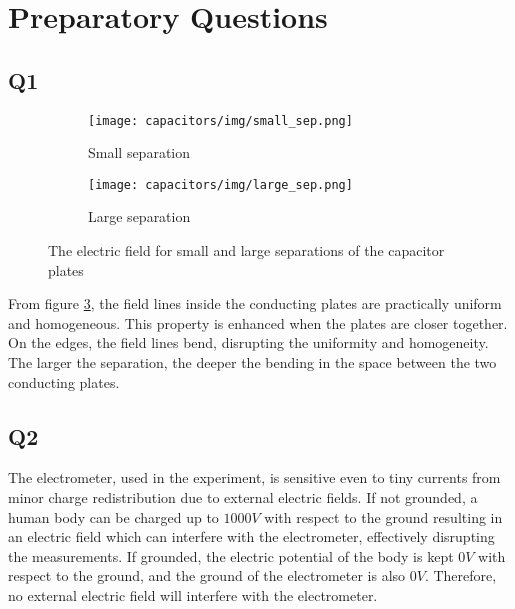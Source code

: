 \section{Preparatory Questions}

\subsection{Q1} \label{appendix:preps:q1}

\begin{figure}[H]
  \begin{subfigure}{0.5\textwidth}
    \texttt{[image: capacitors/img/small\_sep.png]}
    \caption{Small separation} \label{prep_answers:fig:q1:small_sep}
  \end{subfigure}
  \hspace*{\fill}
  \begin{subfigure}{0.5\textwidth}
    \texttt{[image: capacitors/img/large\_sep.png]}
    \caption{Large separation} \label{prep_answers:fig:q1:large_sep}
  \end{subfigure}
  
  \caption{The electric field for small and large separations of the capacitor plates}
  \label{prep_answers:fig:q1}
\end{figure}

From figure \ref{prep_answers:fig:q1}, the field lines inside the conducting plates are practically uniform and homogeneous. This property is enhanced when the plates are closer together. On the edges, the field lines bend, disrupting the uniformity and homogeneity. The larger the separation, the deeper the bending in the space between the two conducting plates.

\subsection{Q2}

The electrometer, used in the experiment, is sensitive even to tiny currents from minor charge redistribution due to external electric fields. If not grounded, a human body can be charged up to $1000V$ with respect to the ground resulting in an electric field which can interfere with the electrometer, effectively disrupting the measurements. If grounded, the electric potential of the body is kept $0V$ with respect to the ground, and the ground of the electrometer is also $0V$. Therefore, no external electric field will interfere with the electrometer.

